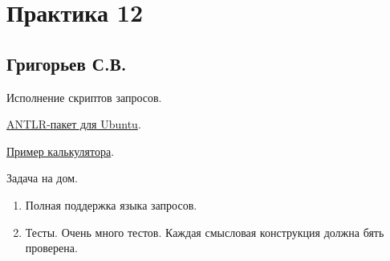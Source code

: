 \section{Практика 12}

\subsection{Григорьев С.В.}


Исполнение скриптов запросов.

\href{https://packages.ubuntu.com/search?keywords=antlr4}{ANTLR-пакет для Ubuntu}.

\href{https://github.com/shmatov/antlr4-calculator}{Пример калькулятора}.


Задача на дом.
\begin{enumerate}
  \item Полная поддержка языка запросов.
  \item Тесты. Очень много тестов. Каждая смысловая конструкция должна бять проверена.

\end{enumerate}
